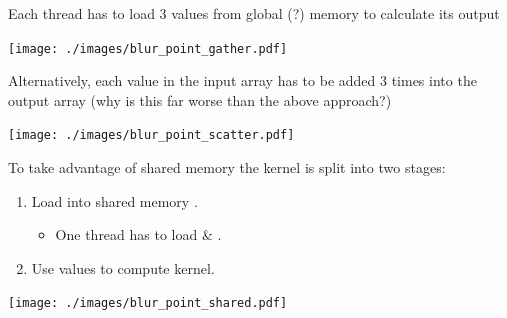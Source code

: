 \documentclass[aspectratio=43]{beamer}
\begin{document}
\begin{frame}[fragile]{}
    Each thread has to load 3 values from global (?) memory to calculate its output \\

    \begin{center}
        \texttt{[image: ./images/blur\_point\_gather.pdf]}
    \end{center}

    Alternatively, each value in the input array has to be added 3 times into the output array (why is this far worse than the above approach?)\\

    \begin{center}
        \texttt{[image: ./images/blur\_point\_scatter.pdf]}
    \end{center}
\end{frame}

\begin{frame}[fragile]{}
    To take advantage of shared memory the kernel is split into two stages:
    \begin{enumerate}
        \item Load  into shared memory .
        \begin{itemize}
            \item One thread has to load  \& .
        \end{itemize}
        \item Use values  to compute kernel.
    \end{enumerate}

    \begin{center}
        \texttt{[image: ./images/blur\_point\_shared.pdf]}
    \end{center}
\end{frame}
\end{document}
